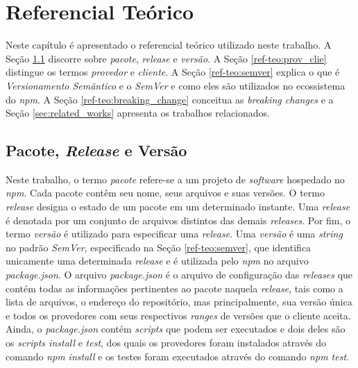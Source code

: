 \chapter{Referencial Teórico}
\label{cap:ref-teorico}
Neste capítulo é apresentado o referencial teórico utilizado neste trabalho. A Seção \ref{ref-teo:pac_rel_ver} discorre sobre \textit{pacote}, \textit{release} e \textit{versão}. A Seção \ref{ref-teo:prov_clie} distingue os termos \textit{provedor} e \textit{cliente}. A Seção \ref{ref-teo:semver} explica o que é \textit{Versionamento Semântico} e o \textit{SemVer} e como eles são utilizados no ecossistema do \textit{npm}. A Seção \ref{ref-teo:breaking_change} conceitua as \textit{breaking changes} e a Seção \ref{sec:related_works} apresenta os trabalhos relacionados.

\section{Pacote, \textit{Release} e Versão}
\label{ref-teo:pac_rel_ver}
Neste trabalho, o termo \textit{pacote} refere-se a um projeto de \textit{software} hospedado no \textit{npm}. Cada pacote contêm seu nome, seus arquivos e suas versões. O termo \textit{release} designa o estado de um pacote em um determinado instante. Uma \textit{release} é denotada por um conjunto de arquivos distintos das demais \textit{releases}. Por fim, o termo \textit{versão} é utilizado para especificar uma \textit{release}. Uma \textit{versão} é uma \textit{string} no padrão \textit{SemVer}, especificado na Seção \ref{ref-teo:semver}, que identifica unicamente uma determinada \textit{release} e é utilizada pelo \textit{npm} no arquivo \textit{package.json}. O arquivo \textit{package.json} é o arquivo de configuração das \textit{releases} que contém todas as informações pertinentes ao pacote naquela \textit{release}, tais como a lista de arquivos, o endereço do repositório, mas principalmente, sua versão única e todos os provedores com seus respectivos \textit{ranges} de versões que o cliente aceita. Ainda, o \textit{package.json} contém \textit{scripts} que podem ser executados e dois deles são os \textit{scripts install} e \textit{test}, dos quais os provedores foram instalados através do comando \textit{npm install} e os testes foram executados através do comando \textit{npm test}.

